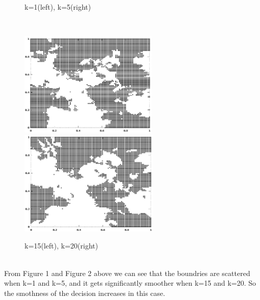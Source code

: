 \documentclass[12pt]{article}
\newenvironment{problem}[2][Problem]{\begin{trivlist}
\item[\hskip \labelsep {\bfseries #1}\hskip \labelsep {\bfseries #2}]}{\end{trivlist}}
\begin{document}
\begin{problem}{4. KNN Classification}
\begin{figure}[h!]
			\caption{k=1(left), k=5(right)}
		\end{figure}\\	
		\begin{figure}[hb!]
			\includegraphics[height=5cm]{15.png}
			\includegraphics[height=5cm]{20.png}
			\caption{k=15(left), k=20(right)}
		\end{figure}\\
From Figure 1 and Figure 2 above we can see that the boundries are scattered when k=1 and k=5, and it gets significantly smoother when k=15 and k=20. So the smothness of the decision increases in this case.
\end{problem}

 
\end{document}
